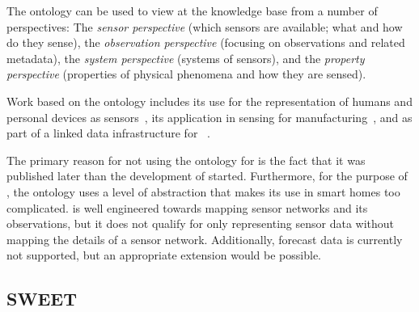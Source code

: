 The ontology can be used to view at the knowledge base from a number of perspectives: The \emph{sensor perspective} (which sensors are available; what and how do they sense), the \emph{observation perspective} (focusing on observations and related metadata), the \emph{system perspective} (systems of sensors), and the \emph{property perspective} (properties of physical phenomena and how they are sensed).

Work based on the  ontology includes its use for the representation of humans and personal devices as sensors~\cite{ssn_example1}, its application in sensing for manufacturing~\cite{ssn_example2}, and as part of a linked data infrastructure for ~\cite{ssn_example3}.

The primary reason for not using the  ontology for \smarthomeweather is the fact that it was published later than the development of \smarthomeweather started. Furthermore, for the purpose of \smarthomeweather, the  ontology uses a level of abstraction that makes its use in smart homes too complicated.  is well engineered towards mapping sensor networks and its observations, but it does not qualify for only representing sensor data without mapping the details of a sensor network. Additionally, forecast data is currently not supported, but an appropriate extension would be possible.

\subsection{SWEET}
\label{subsec:onto5}

